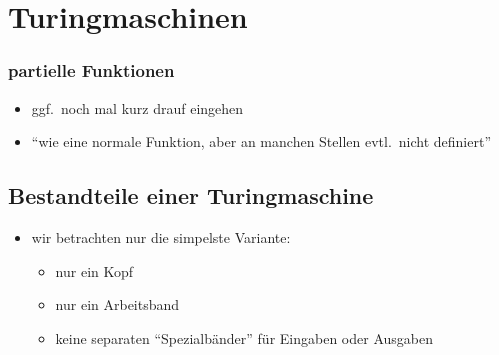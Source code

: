\documentclass[12pt]{article}
\theoremstyle{margin}
\theoremstyle{margin}
\begin{document}


\setcounter{section}{11}

\section{Turingmaschinen}


  \subsubsection*{partielle Funktionen}
  \begin{itemize}
  \item ggf.\ noch mal kurz drauf eingehen
  \item "`wie eine normale Funktion, aber an manchen Stellen evtl.\ nicht definiert"'
  \end{itemize}


\subsection{Bestandteile einer Turingmaschine}
  \begin{itemize}
  \item wir betrachten nur die simpelste Variante:
    \begin{itemize}
    \item nur ein Kopf
    \item nur ein Arbeitsband
    \item keine separaten "`Spezialbänder"' für Eingaben oder Ausgaben
    \end{itemize}
  \end{itemize}
\end{document}
